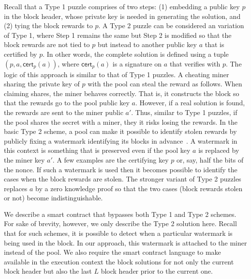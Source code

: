 \documentclass[11pt]{article}
\begin{document}
Recall that a Type 1 puzzle comprises of two steps: (1) embedding a public key $p$ in the block header, whose private key is needed in generating the solution, and (2) tying the block rewards to $p$. 
A Type 2 puzzle can be considered an variation of Type 1, where Step 1 remains the same but Step 2 is modified so that the block rewards are not tied to $p$ but instead to another public key $a$ that is certified by $p$. In other words, the complete solution is defined using a tuple $(p, a, \textsf{cert}_p(a))$, where $\textsf{cert}_p(a)$ is a signature on $a$ that verifies with $p$. The logic of this approach is similar to that of Type 1 puzzles. A cheating miner sharing the private key of $p$ with the pool can steal the reward as follows. When claiming shares, the miner behaves correctly. That is, it constructs the block so that the rewards go to the pool public key $a$. However, if a real solution is found, the rewards are sent to the miner public $a'$. Thus, similar to Type 1 puzzles, if the pool shares the secret with a miner, they it risks losing the rewards. 
In the basic Type 2 scheme, a pool can make it possible to identify stolen rewards by publicly fixing a watermark identifying its blocks in advance~\cite{miller2015nonoutsourceable}. A watermark in this context is something that is preserved even if the pool key $a$ is replaced by the miner key $a'$. A few examples are the certifying key $p$ or, say, half the bits of the nonce. If such a watermark is used then it becomes possible to identify the cases when the block rewards are stolen. 
The stronger variant of Type 2 puzzles replaces $a$ by a zero knowledge proof so that the two cases (block rewards stolen or not) become indistinguishable. 

We describe a smart contract that bypasses both Type 1 and Type 2 schemes. For sake of brevity, however, we only describe the Type 2 solution here. Recall that for such schemes, it is possible to detect when a particular watermark is being used in the block. In our approach, this watermark is attached to the miner instead of the pool. 
We also require the smart contract language to make available in the execution context the block solutions for not only the current block header but also the last $L$ block header prior to the current one. 
\end{document}
